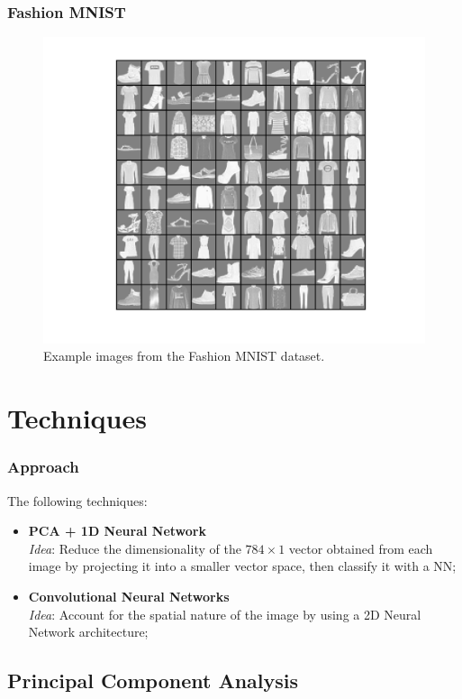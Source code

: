 \documentclass{beamer}
\begin{document}
\begin{frame}
	\frametitle{Fashion MNIST}
	\begin{figure}[hbt]
\includegraphics[width=1\textwidth,height=0.8\textheight,keepaspectratio]{fashion_example}
  	\caption{\footnotesize{Example images from the Fashion MNIST dataset.}}
	\end{figure}
\end{frame}

\section{Techniques}

\begin{frame}
	\frametitle{Approach}
	The following techniques:
	\begin{itemize}
		\item \textbf{PCA + 1D Neural Network} \\ 
			\textit{Idea}: Reduce the dimensionality of the $784\times1$ vector obtained from each image by projecting it into a smaller vector space, then classify it with a NN;
		\vspace{1em}
		\item \textbf{Convolutional Neural Networks} \\
			\textit{Idea}: Account for the spatial nature of the image by using a 2D Neural Network architecture;
	\end{itemize}
\end{frame}

\subsection{Principal Component Analysis}
\end{document}
